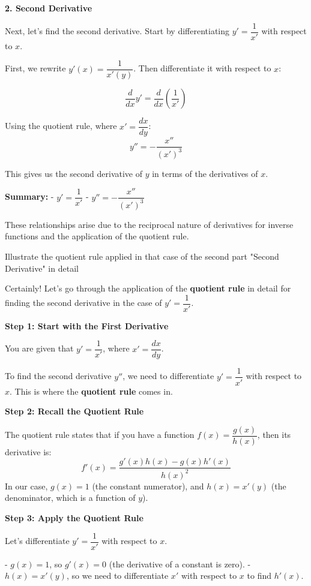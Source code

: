 \documentclass[a4paper,12pt]{book}
\begin{document}
\textbf{2. Second Derivative}

Next, let's find the second derivative. Start by differentiating \( y' = \dfrac{1}{x'} \) with respect to \( x \).

First, we rewrite \( y'(x) = \dfrac{1}{x'(y)} \). Then differentiate it with respect to \( x \):

\[
\dfrac{d}{dx} y' = \dfrac{d}{dx} \left( \dfrac{1}{x'} \right)
\]

Using the quotient rule, where \( x' = \dfrac{dx}{dy} \):
\[
y'' = -\dfrac{x''}{(x')^3}
\]

This gives us the second derivative of \( y \) in terms of the derivatives of \( x \).

\textbf{Summary:}
- \( y' = \dfrac{1}{x'} \)
- \( y'' = -\dfrac{x''}{(x')^3} \)

These relationships arise due to the reciprocal nature of derivatives for inverse functions and the application of the quotient rule.

\begin{bluebox}
Illustrate the quotient rule applied in that case of the second part "Second Derivative" in detail
\end{bluebox}


Certainly! Let’s go through the application of the \textbf{quotient rule} in detail for finding the second derivative in the case of \( y' = \dfrac{1}{x'} \).

\textbf{Step 1: Start with the First Derivative}

You are given that \( y' = \dfrac{1}{x'} \), where \( x' = \dfrac{dx}{dy} \).

To find the second derivative \( y'' \), we need to differentiate \( y' = \dfrac{1}{x'} \) with respect to \( x \). This is where the \textbf{quotient rule} comes in.

\textbf{Step 2: Recall the Quotient Rule}

The quotient rule states that if you have a function \( f(x) = \dfrac{g(x)}{h(x)} \), then its derivative is:
\[
f'(x) = \dfrac{g'(x)h(x) - g(x)h'(x)}{h(x)^2}
\]
In our case, \( g(x) = 1 \) (the constant numerator), and \( h(x) = x'(y) \) (the denominator, which is a function of \( y \)).

\textbf{Step 3: Apply the Quotient Rule}

Let’s differentiate \( y' = \dfrac{1}{x'} \) with respect to \( x \).

- \( g(x) = 1 \), so \( g'(x) = 0 \) (the derivative of a constant is zero).
- \( h(x) = x'(y) \), so we need to differentiate \( x' \) with respect to \( x \) to find \( h'(x) \).
\end{document}

